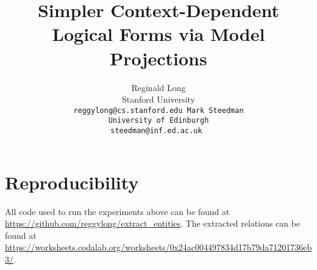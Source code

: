 \documentclass[11pt]{article}
\title{Simpler Context-Dependent Logical Forms via Model Projections}
\author{
  Reginald Long \\
  Stanford University \\
  \tt{reggylong@cs.stanford.edu}
\And
  Mark Steedman \\
  University of Edinburgh \\
  \tt{steedman@inf.ed.ac.uk}
}
\date{}
\begin{document}
\maketitle

\begin{abstract}
  
\end{abstract}



 




\section{Reproducibility}
All code used to run the experiments above can be
found at \url{https://github.com/reggylong/extract_entities}.
The extracted relations can be found at 
\url{https://worksheets.codalab.org/worksheets/0x24ac004497834d17b79da71201736eb3/}.



\end{document}
